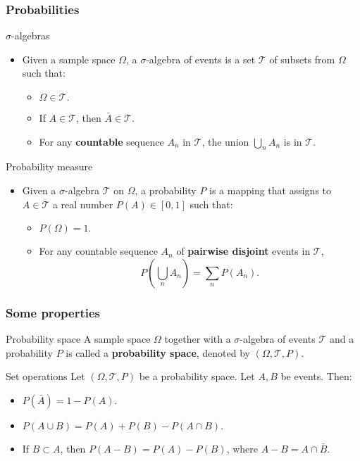\begin{frame}
    \frametitle{Probabilities}
    \begin{block}{$\sigma$-algebras}
        \begin{itemize}
            \item<+-> Given a sample space $\Omega$, a $\sigma$-algebra of
            events is a set $\mathcal{T}$ of subsets from $\Omega$ such that:
            \begin{itemize}
                \item<+-> $\Omega \in \mathcal{T}.$
                \item<+-> If $A \in \mathcal{T}$, then $\bar{A} \in \mathcal{T}.$
                \item<+-> For any \textbf{countable} sequence $A_n$ in $\mathcal{T}$, the union
                $\bigcup_n A_n$ is in $\mathcal{T}.$
            \end{itemize}
        \end{itemize}
    \end{block}
\begin{block}{Probability measure}
    \begin{itemize}
        \item<+-> Given a $\sigma$-algebra $\mathcal{T}$ on $\Omega$, a 
        probability $P$ is a mapping that assigns to $A \in \mathcal{T}$ a real
        number $P(A) \in [0,1]$ such that:
        \begin{itemize}
        \item<+-> $P\left( \Omega \right) = 1.$
        \item<+-> For any countable sequence $A_n$ of \textbf{pairwise disjoint} events in $\mathcal{T}$,
        \begin{equation}
             \label{eq:proba_additivty}
            P\left( \bigcup_n A_n \right) = \sum_n P\left( A_n \right).
        \end{equation}
        \end{itemize}
    \end{itemize}
\end{block}
\end{frame}
\begin{frame}
    \frametitle{Some properties}
\begin{block}{Probability space}
A sample space $\Omega$ together with a $\sigma$-algebra of events $\mathcal{T}$ and
a probability $P$ is called a \textbf{probability space}, denoted by 
$\left( \Omega, \mathcal{T}, P \right).$
\end{block}
\begin{block}{Set operations}
    Let $\left( \Omega, \mathcal{T}, P \right)$ be a probability space. 
    Let $A,B$ be events. Then:
    \begin{itemize}
        \item<+-> $P\left(\bar{A} \right) = 1 - P(A).$
        \item<+-> $P\left( A \cup B \right) = P(A) + P(B) - P\left( A \cap B \right).$
        \item<+-> If $B \subset A$, then $P\left( A - B \right) = P(A) - P(B)$, where
        $A-B = A \cap \bar{B}.$
    \end{itemize}
\end{block}
\end{frame}
